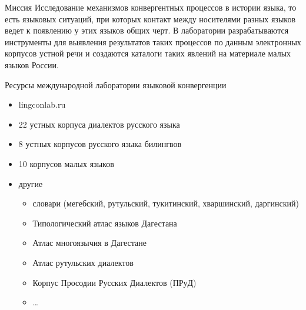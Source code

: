 \documentclass[
  ignorenonframetext,
]{beamer}
\providecommand{\tightlist}{%
  \setlength{\itemsep}{0pt}\setlength{\parskip}{0pt}}
\begin{document}
\begin{frame}{Миссия}
\protect\hypertarget{ux43cux438ux441ux441ux438ux44f}{}
Исследование механизмов конвергентных процессов в истории языка, то есть
языковых ситуаций, при которых контакт между носителями разных языков
ведет к появлению у этих языков общих черт. В лаборатории
разрабатываются инструменты для выявления результатов таких процессов по
данным электронных корпусов устной речи и создаются каталоги таких
явлений на материале малых языков России.
\end{frame}

\begin{frame}{Ресурсы международной лаборатории языковой конвергенции}
\protect\hypertarget{ux440ux435ux441ux443ux440ux441ux44b-ux43cux435ux436ux434ux443ux43dux430ux440ux43eux434ux43dux43eux439-ux43bux430ux431ux43eux440ux430ux442ux43eux440ux438ux438-ux44fux437ux44bux43aux43eux432ux43eux439-ux43aux43eux43dux432ux435ux440ux433ux435ux43dux446ux438ux438}{}
\begin{itemize}
\tightlist
\item
  lingconlab.ru
\item
  22 устных корпуса диалектов русского языка
\item
  8 устных корпусов русского языка билингвов
\item
  10 корпусов малых языков
\item
  другие

  \begin{itemize}
  \tightlist
  \item
    словари (мегебский, рутульский, тукитинский, хваршинский,
    даргинский)
  \item
    Типологический атлас языков Дагестана
  \item
    Атлас многоязычия в Дагестане
  \item
    Атлас рутульских диалектов
  \item
    Корпус Просодии Русских Диалектов (ПРуД)
  \item
    \ldots{}
  \end{itemize}
\end{itemize}
\end{frame}
\end{document}
